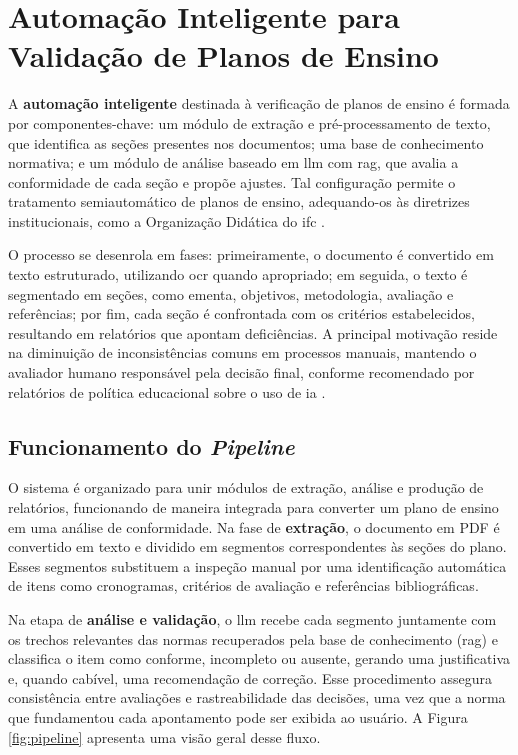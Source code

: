 \section{Automação Inteligente para Validação de Planos de Ensino}
A \textbf{automação inteligente} destinada à verificação de planos de ensino é formada por componentes-chave: um módulo de extração e pré-processamento de texto, que identifica as seções presentes nos documentos; uma base de conhecimento normativa; e um módulo de análise baseado em \gls{llm} com \gls{rag}, que avalia a conformidade de cada seção e propõe ajustes. Tal configuração permite o tratamento semiautomático de planos de ensino, adequando-os às diretrizes institucionais, como a Organização Didática do \gls{ifc} \cite{ifc2022}.

O processo se desenrola em fases: primeiramente, o documento é convertido em texto estruturado, utilizando \gls{ocr} quando apropriado; em seguida, o texto é segmentado em seções, como ementa, objetivos, metodologia, avaliação e referências; por fim, cada seção é confrontada com os critérios estabelecidos, resultando em relatórios que apontam deficiências. A principal motivação reside na diminuição de inconsistências comuns em processos manuais, mantendo o avaliador humano responsável pela decisão final, conforme recomendado por relatórios de política educacional sobre o uso de \gls{ia} \cite{USDeptEd2023}.

\subsection{Funcionamento do \textit{Pipeline}}
O sistema é organizado para unir módulos de extração, análise e produção de relatórios, funcionando de maneira integrada para converter um plano de ensino em uma análise de conformidade. Na fase de \textbf{extração}, o documento em PDF é convertido em texto e dividido em segmentos correspondentes às seções do plano. Esses segmentos substituem a inspeção manual por uma identificação automática de itens como cronogramas, critérios de avaliação e referências bibliográficas.

Na etapa de \textbf{análise e validação}, o \gls{llm} recebe cada segmento juntamente com os trechos relevantes das normas recuperados pela base de conhecimento (\gls{rag}) e classifica o item como conforme, incompleto ou ausente, gerando uma justificativa e, quando cabível, uma recomendação de correção. Esse procedimento assegura consistência entre avaliações e rastreabilidade das decisões, uma vez que a norma que fundamentou cada apontamento pode ser exibida ao usuário. A Figura \ref{fig:pipeline} apresenta uma visão geral desse fluxo.

